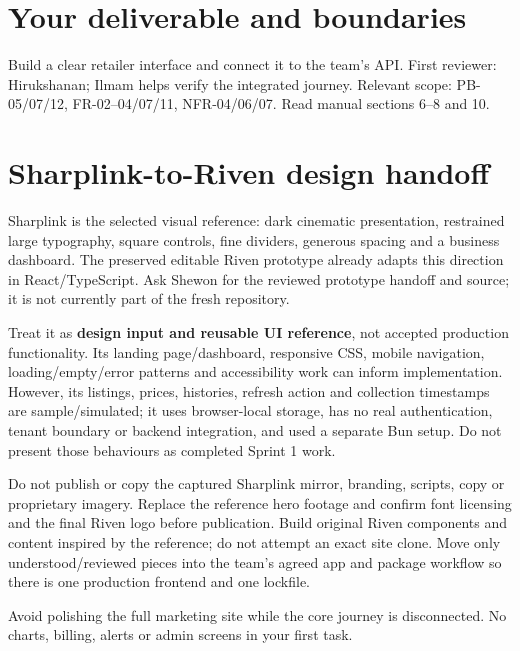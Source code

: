 
\sharedintro
\section*{Your deliverable and boundaries}
Build a clear retailer interface and connect it to the team's API. First reviewer: Hirukshanan; Ilmam helps verify the integrated journey. Relevant scope: PB-05/07/12, FR-02--04/07/11, NFR-04/06/07. Read manual sections 6--8 and 10.

\section*{Sharplink-to-Riven design handoff}
Sharplink is the selected visual reference: dark cinematic presentation, restrained large typography, square controls, fine dividers, generous spacing and a business dashboard. The preserved editable Riven prototype already adapts this direction in React/TypeScript. Ask Shewon for the reviewed prototype handoff and source; it is not currently part of the fresh repository.

Treat it as \textbf{design input and reusable UI reference}, not accepted production functionality. Its landing page/dashboard, responsive CSS, mobile navigation, loading/empty/error patterns and accessibility work can inform implementation. However, its listings, prices, histories, refresh action and collection timestamps are sample/simulated; it uses browser-local storage, has no real authentication, tenant boundary or backend integration, and used a separate Bun setup. Do not present those behaviours as completed Sprint 1 work.

Do not publish or copy the captured Sharplink mirror, branding, scripts, copy or proprietary imagery. Replace the reference hero footage and confirm font licensing and the final Riven logo before publication. Build original Riven components and content inspired by the reference; do not attempt an exact site clone. Move only understood/reviewed pieces into the team's agreed app and package workflow so there is one production frontend and one lockfile.

Avoid polishing the full marketing site while the core journey is disconnected. No charts, billing, alerts or admin screens in your first task.
\newpage

